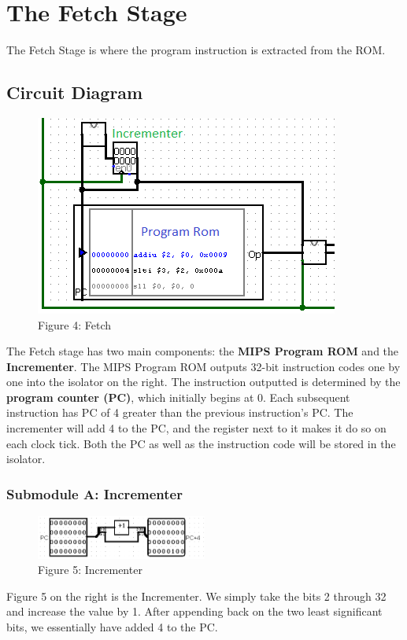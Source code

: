 \documentclass{article}
\begin{document}
\section{The Fetch Stage}
The Fetch Stage is where the program instruction is extracted from the ROM. 
\subsection{Circuit Diagram}
\begin{figure}
\vspace{-1.7cm}
\begin{center}
\includegraphics[scale=0.9]{Fetch.png} \\
Figure 4: Fetch
\end{center}
\vspace{-1.2cm}
\end{figure}
The Fetch stage has two main components: the \textbf{MIPS Program ROM} and the \textbf{Incrementer}. The MIPS Program ROM outputs 32-bit instruction codes one by one into the isolator on the right. The instruction outputted is determined by the \textbf{program counter (PC)}, which initially begins at 0. Each subsequent instruction has PC of 4 greater than the previous instruction's PC. The incrementer will add 4 to the PC, and the register next to it makes it do so on each clock tick. Both the PC as well as the instruction code will be stored in the isolator.

\subsubsection{Submodule A: Incrementer}
\begin{figure}
\vspace{-1.4cm}
\begin{center}
\includegraphics[width=0.5\textwidth]{Incrementer.png}\\
Figure 5: Incrementer
\end{center}
\vspace{-13mm}
\end{figure}
Figure 5 on the right is the Incrementer. We simply take the bits 2 through 32 and increase the value by 1. After appending back on the two least significant bits, we essentially have added 4 to the PC.
\end{document}
